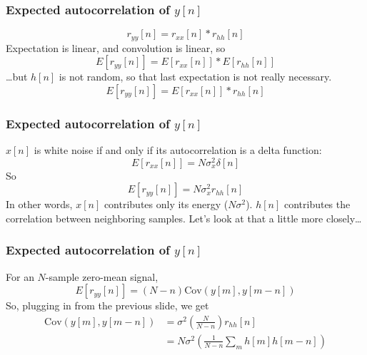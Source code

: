 \documentclass{beamer}
\begin{document}
\begin{frame}
  \frametitle{Expected autocorrelation of $y[n]$}

  \[
  r_{yy}[n] = r_{xx}[n] \ast r_{hh}[n]
  \]
  Expectation is linear, and convolution is linear, so
  \[
  E\left[r_{yy}[n]\right] = E\left[r_{xx}[n]\right] \ast E\left[r_{hh}[n]\right]
  \]
  \ldots but $h[n]$ is not  random, so that last expectation is not really necessary.
  \[
  E\left[r_{yy}[n]\right] = E\left[r_{xx}[n]\right] \ast r_{hh}[n]
  \]
\end{frame}
\begin{frame}
  \frametitle{Expected autocorrelation of $y[n]$}
  
  $x[n]$ is white noise if and  only if its autocorrelation is a delta function:
  \[
  E\left[r_{xx}[n]\right] = N\sigma_x^2 \delta[n]
  \]
  So
  \[
  E\left[r_{yy}[n]\right] = N\sigma_x^2 r_{hh}[n]
  \]
  In other words, $x[n]$ contributes only its energy ($N\sigma^2$).  $h[n]$ contributes the
  correlation between neighboring  samples.  Let's look at that a little more closely\ldots
  
\end{frame}

\begin{frame}
  \frametitle{Expected autocorrelation of $y[n]$}
  
  For an $N$-sample zero-mean signal,
  \[
  E\left[r_{yy}[n]\right] = (N-n)\mbox{Cov}\left(y[m],y[m-n]\right)
  \]
  So, plugging in from the previous slide, we get
  \begin{align*}
    \mbox{Cov}\left(y[m],y[m-n]\right) &= \sigma^2\left(\frac{N}{N-n}\right)r_{hh}[n]\\
    &= N\sigma^2\left(\frac{1}{N-n}\sum_{m} h[m] h[m-n]\right)
  \end{align*}
\end{frame}
\end{document}
